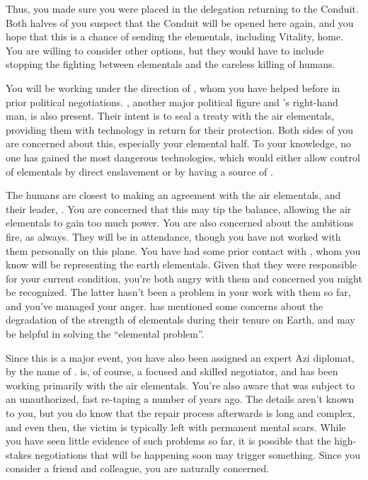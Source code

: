 \documentclass[char]{elementals}
\begin{document}
Thus, you made sure you were placed in the delegation returning to the Conduit.  Both halves of you suspect that the Conduit will be opened here again, and you hope that this is a chance of sending the elementals, including Vitality, home.  You are willing to consider other options, but they would have to include stopping the fighting between elementals and the careless killing of humans.

You will be working under the direction of \cLeader{}, whom you have helped before in prior political negotiations.  \cDema{}, another major political figure and \cLeader{}'s right-hand man, is also present.  Their intent is to seal a treaty with the air elementals, providing them with technology in return for their protection.  Both sides of you are concerned about this, especially your elemental half.  To your knowledge, no one has gained the most dangerous technologies, which would either allow control of elementals by direct enslavement or by having a source of \iWhite{}.

The humans are closest to making an agreement with the air elementals, and their leader, \cKing{}.  You are concerned that this may tip the balance, allowing the air elementals to gain too much power.  You are also concerned about the ambitions fire, as always.  They will be in attendance, though you have not worked with them personally on this plane.  You have had some prior contact with \cLoyal{}, whom you know will be representing the earth elementals.  Given that they were responsible for your current condition, you're both angry with them and concerned you might be recognized.  The latter hasn't been a problem in your work with them so far, and you've managed your anger.  \cLoyal{} has mentioned some concerns about the degradation of the strength of elementals during their tenure on Earth, and may be helpful in solving the ``elemental problem''.

Since this is a major event, you have also been assigned an expert Azi diplomat, by the name of \cDiplomat{}.  \cDiplomat{\They} is, of course, a focused and skilled negotiator, and has been working primarily with the air elementals.  You're also aware that \cDiplomat{\they} was subject to an unauthorized, fast re-taping a number of years ago.  The details aren't known to you, but you do know that the repair process afterwards is long and complex, and even then, the victim is typically left with permanent mental scars.  While you have seen little evidence of such problems so far, it is possible that the high-stakes negotiations that will be happening soon may trigger something.  Since you consider \cDiplomat{} a friend and colleague, you are naturally concerned.
\end{document}
